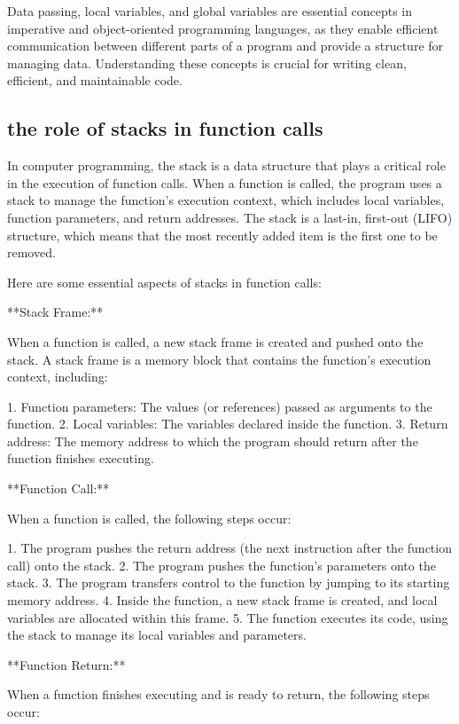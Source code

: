 \documentclass{article}
\begin{document}
Data passing, local variables, and global variables are essential concepts in imperative and object-oriented programming languages, as they enable efficient communication between different parts of a program and provide a structure for managing data. Understanding these concepts is crucial for writing clean, efficient, and maintainable code.


\subsection{the role of stacks in function calls}

In computer programming, the stack is a data structure that plays a critical role in the execution of function calls. When a function is called, the program uses a stack to manage the function's execution context, which includes local variables, function parameters, and return addresses. The stack is a last-in, first-out (LIFO) structure, which means that the most recently added item is the first one to be removed.

Here are some essential aspects of stacks in function calls:

**Stack Frame:**

When a function is called, a new stack frame is created and pushed onto the stack. A stack frame is a memory block that contains the function's execution context, including:

1. Function parameters: The values (or references) passed as arguments to the function.
2. Local variables: The variables declared inside the function.
3. Return address: The memory address to which the program should return after the function finishes executing.

**Function Call:**

When a function is called, the following steps occur:

1. The program pushes the return address (the next instruction after the function call) onto the stack.
2. The program pushes the function's parameters onto the stack.
3. The program transfers control to the function by jumping to its starting memory address.
4. Inside the function, a new stack frame is created, and local variables are allocated within this frame.
5. The function executes its code, using the stack to manage its local variables and parameters.

**Function Return:**

When a function finishes executing and is ready to return, the following steps occur:
\end{document}
